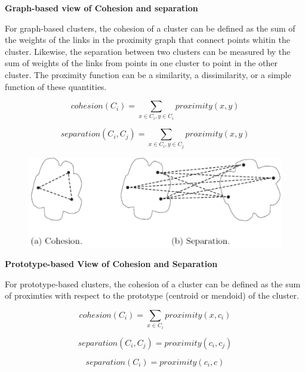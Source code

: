 			{\bf Graph-based view of Cohesion and separation}

			For graph-based clusters, the cohesion of a cluster can be defined as the sum
			of the weights of the links in the proximity graph that connect points whitin 
			the cluster. 
			Likewise, the separation between two clusters can be measured by the sum of
			weights of the links from points in one cluster to point in the other cluster.
			The proximity function can be a similarity, a dissimilarity, or a simple function
			of these quantities. 

				\begin{equation}
					cohesion(C_{i}) = \sum_{x \in C_{i}, y \in C_{i}} proximity(x,y)
				\end{equation} 

				\begin{equation}
					separation(C_{i}, C_{j}) = \sum_{x \in C_{i}, y \in C_{j}} proximity(x,y)
				\end{equation} 

			\begin{figure}[H]
				\centering
				\includegraphics[scale=0.3]{pics/graphbased.png}
			\end{figure}


			{\bf Prototype-based View of Cohesion and Separation}

			For prototype-based clusters, the cohesion of a cluster can be defined as the sum
			of proximties with respect to the prototype (centroid or mendoid) of the cluster.

			\begin{equation}
				cohesion(C_{i}) = \sum_{x \in C_{i}} proximity(x, c_{i})
			\end{equation}

			\begin{equation}
				separation(C_{i}, C_{j}) = proximity(c_{i}, c_{j})
			\end{equation}

			\begin{equation}
				separation(C_{i}) = proximity(c_{i}, c)
			\end{equation}

